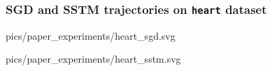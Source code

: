 \begin{frame}
    \frametitle{SGD and SSTM trajectories on \texttt{heart} dataset}
    \begin{multicols}{2}
        \noindent
         {pics/paper_experiments/heart_sgd.svg} \par
         {pics/paper_experiments/heart_sstm.svg}
    \end{multicols}
\end{frame}

